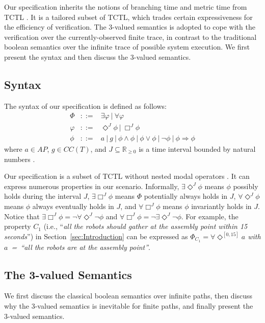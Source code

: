 \documentclass[10pt,conference,compsocconf,letterpaper]{IEEEtran}
\begin{document}
Our specification inherits the notions of branching time and metric time from TCTL \cite{Alur94}. It is a tailored subset of TCTL, which trades certain expressiveness for the efficiency of verification. The 3-valued semantics is adopted to cope with the verification over the currently-observed finite trace, in contrast to the traditional boolean semantics over the infinite trace of possible system execution. We first present the syntax and then discuss the 3-valued semantics.

\subsection{Syntax}

The syntax of our specification is defined as follows:
\begin{eqnarray*}
  \Phi &::=& \exists \varphi~|~\forall \varphi \\
  \varphi &::=& \Diamond ^J \phi~|~\Box ^J \phi \\
  \phi &::=& a~|~g~|~\phi \wedge \phi~|~\phi \vee \phi~|~\neg \phi~|~\phi \Rightarrow \phi
\end{eqnarray*}
where $a\in AP$, $g\in CC(T)$, and $J\subseteq\mathbb{R}_{\geq 0}$ is a time interval bounded by natural numbers \cite{Baier08}.

Our specification is a subset of TCTL without nested modal operators \cite{Behrmann04}. It can express numerous properties in our scenario. Informally, $\exists \Diamond ^J \phi$ means $\phi$ possibly holds during the interval $J$, $\exists \Box ^J \phi$ means $\Phi$ potentially always holds in $J$, $\forall \Diamond ^J \phi$ means $\phi$ always eventually holds in $J$, and $\forall \Box ^J \phi$ means $\phi$ invariantly holds in $J$. Notice that $\exists \Box ^J \phi = \neg \forall \Diamond ^J \neg \phi$ and $\forall \Box ^J \phi = \neg \exists \Diamond ^J \neg \phi$. For example, the property $C_1$ (i.e., ``\textit{all the robots should gather at the assembly point within 15 seconds}'') in Section~\ref{sec:Introduction} can be expressed as \textit{$\Phi_{C_1} = \forall \Diamond^{[0, 15]} a$ with $a$~=~``all the robots are at the assembly point''}.

\subsection{The 3-valued Semantics}\label{sec:Semantics}

We first discuss the classical boolean semantics over infinite paths, then discuss why the 3-valued semantics is inevitable for finite paths, and finally present the 3-valued semantics.
\end{document}
